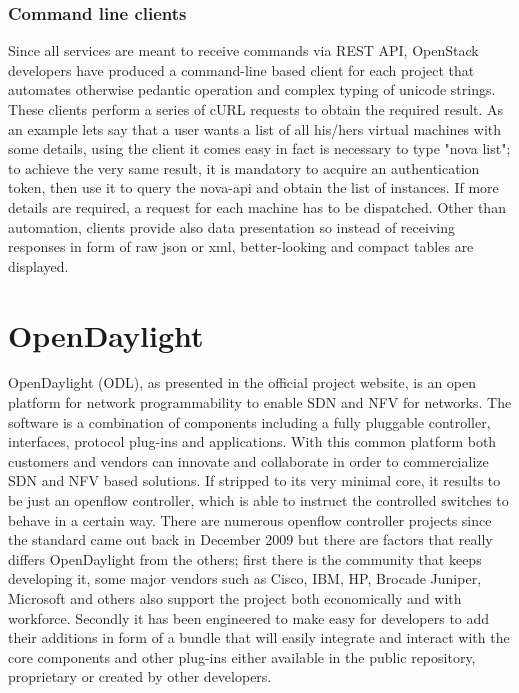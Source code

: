 \subsubsection{Command line clients}
Since all services are meant to receive commands via REST API, OpenStack developers have produced a command-line based client for each project that automates otherwise pedantic operation and complex typing of unicode strings.
These clients perform a series of cURL requests to obtain the required result.
As an example lets say that a user wants a list of all his/hers virtual machines with some details, using the client it comes easy in fact is necessary to type "nova list"; to achieve the very same result, it is mandatory to acquire an authentication token, then use it to query the nova-api and obtain the list of instances. If more details are required, a request for each machine has to be dispatched.
Other than automation, clients provide also data presentation so instead of receiving responses in form of raw json or xml, better-looking and compact tables are displayed.

\section{OpenDaylight}
\label{sec:opendaylight}
OpenDaylight (ODL), as presented in the official project website\cite{Opendaylightwebsite}, is an open platform for network programmability to enable SDN and NFV for networks.
The software is a combination of components including a fully pluggable controller, interfaces, protocol plug-ins and applications. With this common platform both customers and vendors can innovate and collaborate in order to commercialize SDN and NFV based solutions.
If stripped to its very minimal core, it results to be just an openflow controller, which is able to instruct the controlled switches to behave in a certain way.
There are numerous openflow controller projects since the standard came out back in December 2009 but there are factors that really differs OpenDaylight from the others; first there is the community that keeps developing it, some major vendors such as Cisco, IBM, HP, Brocade Juniper, Microsoft and others also support the project both economically and with workforce.
Secondly it has been engineered to make easy for developers to add their additions in form of a bundle that will easily integrate and interact with the core components and other plug-ins either available in the public repository, proprietary or created by other developers.

